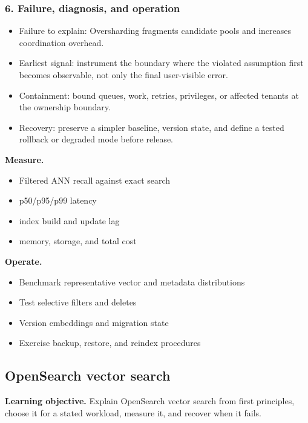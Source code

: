 \subsubsection*{6. Failure, diagnosis, and operation}
\begin{itemize}
\item Failure to explain: Oversharding fragments candidate pools and increases coordination overhead.
\item Earliest signal: instrument the boundary where the violated assumption first becomes observable, not only the final user-visible error.
\item Containment: bound queues, work, retries, privileges, or affected tenants at the ownership boundary.
\item Recovery: preserve a simpler baseline, version state, and define a tested rollback or degraded mode before release.
\end{itemize}
\textbf{Measure.}\begin{itemize}
\item Filtered ANN recall against exact search
\item p50/p95/p99 latency
\item index build and update lag
\item memory, storage, and total cost
\end{itemize}
\textbf{Operate.}\begin{itemize}
\item Benchmark representative vector and metadata distributions
\item Test selective filters and deletes
\item Version embeddings and migration state
\item Exercise backup, restore, and reindex procedures
\end{itemize}
\subsection{OpenSearch vector search}
\textbf{Learning objective.} Explain OpenSearch vector search from first principles, choose it for a stated workload, measure it, and recover when it fails.
